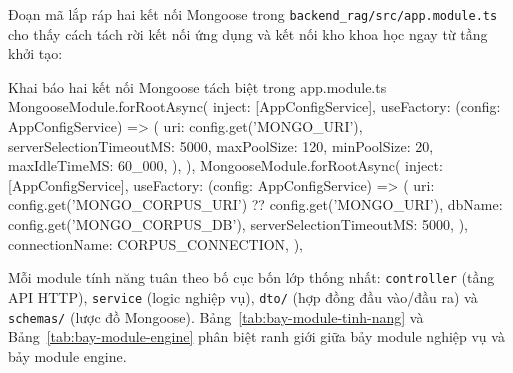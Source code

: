 Đoạn mã lắp ráp hai kết nối Mongoose trong \texttt{backend\_\allowbreak{}rag/\allowbreak{}src/\allowbreak{}app.\allowbreak{}module.\allowbreak{}ts} cho thấy cách tách rời kết nối ứng dụng và kết nối kho khoa học ngay từ tầng khởi tạo:

\begin{tsbox}{Khai báo hai kết nối Mongoose tách biệt trong app.module.ts}
MongooseModule.forRootAsync({
  inject: [AppConfigService],
  useFactory: (config: AppConfigService) => ({
    uri: config.get('MONGO_URI'),
    serverSelectionTimeoutMS: 5000,
    maxPoolSize: 120,
    minPoolSize: 20,
    maxIdleTimeMS: 60_000,
  }),
}),
MongooseModule.forRootAsync({
  inject: [AppConfigService],
  useFactory: (config: AppConfigService) => ({
    uri: config.get('MONGO_CORPUS_URI') ?? config.get('MONGO_URI'),
    dbName: config.get('MONGO_CORPUS_DB'),
    serverSelectionTimeoutMS: 5000,
  }),
  connectionName: CORPUS_CONNECTION,
}),
\end{tsbox}

Mỗi module tính năng tuân theo bố cục bốn lớp thống nhất: \texttt{controller} (tầng API HTTP), \texttt{service} (logic nghiệp vụ), \texttt{dto/} (hợp đồng đầu vào/đầu ra) và \texttt{schemas/} (lược đồ Mongoose). Bảng~\ref{tab:bay-module-tinh-nang} và Bảng~\ref{tab:bay-module-engine} phân biệt ranh giới giữa bảy module nghiệp vụ và bảy module engine.

